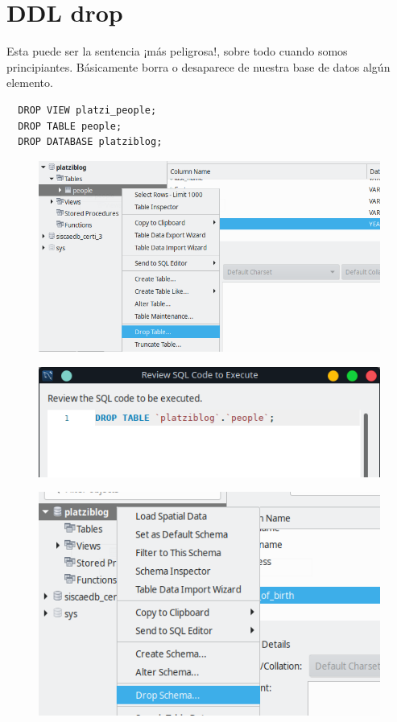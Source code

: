 \documentclass{article}
\begin{document}
\section{DDL drop}%
Esta puede ser la sentencia ¡más peligrosa!, sobre todo cuando somos
principiantes. Básicamente borra o desaparece de nuestra base de datos algún
elemento.

\begin{verbatim}
  DROP VIEW platzi_people;
  DROP TABLE people;
  DROP DATABASE platziblog;
\end{verbatim}

\begin{figure}[h!]
  \centering
  \includegraphics[scale=0.75]{./Pictures/058_drop_table.png}
\end{figure}

\newpage

\begin{figure}[h!]
  \centering
  \includegraphics[scale=0.75]{./Pictures/059_drop_table_retriew.png}
\end{figure}

\begin{figure}[h!]
  \centering
  \includegraphics[scale=0.75]{./Pictures/060_drop_schema.png}
\end{figure}
\end{document}
